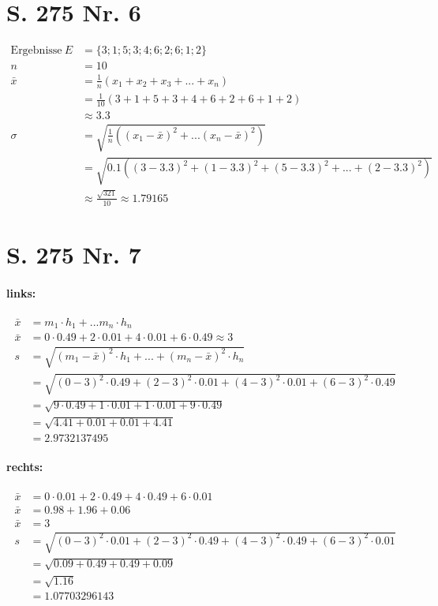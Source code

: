 \documentclass[12pt,a4paper]{report}
\begin{document}
	\section{S. 275 Nr. 6}
	\begin{align*}
		\text{Ergebnisse}\ E &= \{3;1;5;3;4;6;2;6;1;2\} \\
		n &= 10 \\
		\bar{x} &= \frac{1}{n}(x_1 + x_2 + x_3 + ... + x_n)\\
		&= \frac{1}{10}(3+1+5+3+4+6+2+6+1+2) \\
		&\approx 3.3 \\
		\sigma &= \sqrt{\frac{1}{n}((x_1 - \bar{x})^2 + ... (x_n - \bar{x})^2)} \\
		&= \sqrt{0.1 (
		(3 - 3.3)^2
		+ (1-3.3)^2
		+ (5-3.3)^2
		+ ...
		+ (2-3.3)^2
		)} \\
		&\approx \frac{\sqrt{321}}{10} \approx 1.79165
	\end{align*}
	\section{S. 275 Nr. 7}
	\paragraph{links:}
	\begin{align*}
		\bar{x} &= m_1 \cdot h_1 + ... m_n \cdot h_n \\
		\bar{x} &= 0 \cdot 0.49 + 2 \cdot 0.01 + 4 \cdot 0.01 + 6 \cdot 0.49 \approx 3 \\
		s &= \sqrt{(m_1 -\bar{x})^2\cdot h_1 + ... + (m_n - \bar{x})^2 \cdot h_n} \\
		&= \sqrt{(0-3)^2 \cdot 0.49 + (2-3)^2 \cdot 0.01 + (4-3)^2 \cdot 0.01 + (6 - 3)^2 \cdot 0.49} \\
		&= \sqrt{9 \cdot 0.49 + 1 \cdot 0.01 + 1 \cdot 0.01 + 9 \cdot 0.49} \\
		&= \sqrt{4.41 + 0.01 + 0.01 + 4.41} \\\
		&= 2.9732137495
	\end{align*}
	\paragraph{rechts:}
	\begin{align*}
		\bar{x} &= 0 \cdot 0.01 + 2 \cdot 0.49 + 4 \cdot 0.49 + 6 \cdot 0.01 \\
		\bar{x} &= 0.98 + 1.96 + 0.06 \\
		\bar{x} &= 3 \\
		s &= \sqrt{(0 - 3)^2 \cdot 0.01 + (2-3)^2 \cdot 0.49 + (4-3)^2 \cdot 0.49 + (6-3)^2 \cdot 0.01} \\
		&= \sqrt{0.09 + 0.49 + 0.49 + 0.09} \\
		&= \sqrt{1.16} \\
		&= 1.07703296143
	\end{align*}
\end{document}
